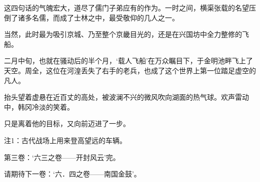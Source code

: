 这四句话的气魄宏大，道尽了儒门子弟应有的作为。一时之间，横渠张载的名望压倒了诸多名儒，而成了士林之中，最受敬仰的几人之一。

当然，此时最为吸引京城、乃至整个京畿目光的，还是在兴国坊中全力整修的飞船。

二月中旬，也就在骚动后的半个月，‘载人飞船’在万众瞩目下，于金明池畔飞上了天空。周全，这位在河湟丢失了右手的老兵，也成了这个世界上第一位踏足虚空的凡人。

抬头望着虚悬在近百丈的高处，被波澜不兴的微风吹向湖面的热气球。欢声雷动中，韩冈冷淡的笑着。

只是离着他的目标，又向前迈进了一步。

注1：古代战场上用来登高望远的车辆。

第三卷：‘六三之卷——开封风云’完。

请期待下一卷：‘六．四之卷——南国金鼓’。

